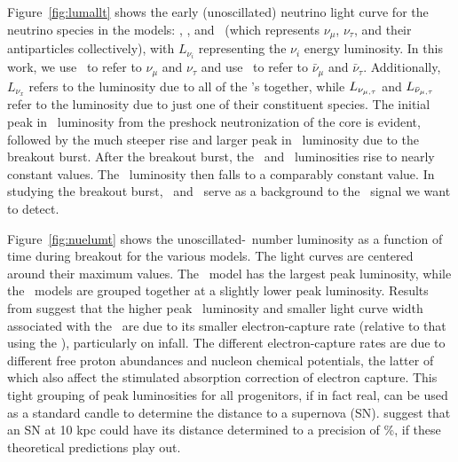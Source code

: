 Figure~\ref{fig:lumallt} shows the early (unoscillated) neutrino light curve for the
neutrino species in the models: \nue, \anue, and \nux\ (which represents
$\nu_\mu$, $\nu_\tau$, and their antiparticles collectively), with
$L_{\nu_i}$ representing the $\nu_i$ energy luminosity. In this work,
we use \nuxpart\ to refer to $\nu_\mu$ and $\nu_\tau$ and use \nuxanti\
to refer to $\bar\nu_\mu$ and $\bar\nu_\tau$.
Additionally, $L_{\nu_x}$ refers to the luminosity due to all of
the \nux's together, while  $L_{\nu_{\mu,\nobreak \tau}}$ and
$L_{\bar\nu_{\mu,\nobreak \tau}}$ refer to the luminosity due to just
one of their constituent species.
The initial peak in \nue\ luminosity
from the preshock neutronization of the core is evident, followed
by the much steeper rise and
larger peak in \nue\ luminosity due to the breakout burst. After the 
breakout burst, the \anue\ and
\nux\ luminosities rise to nearly constant values.  The \nue\ luminosity
then falls to a comparably constant value.  In studying the
breakout burst, \anue\ and \nux\ serve as a background 
to the \nue\ signal we want to detect.

Figure~\ref{fig:nuelumt} shows the unoscillated-\nue\ number luminosity as a function of
time during breakout for the various models. The light curves are
centered around their maximum values. The \shen\ model has the largest
peak luminosity,
while the \ls\ models are grouped together at a slightly lower peak
luminosity. 
Results from \cite{sullivanetal2015} suggest that the higher peak 
\nue\ luminosity and smaller light curve width associated with the \shen\ 
are due to its smaller electron-capture rate (relative to that 
using the \ls), particularly on infall.  The different 
electron-capture rates are due to different free proton 
abundances and nucleon chemical potentials, the latter of which 
also affect the stimulated absorption correction of electron capture.
This tight grouping of peak luminosities for all progenitors, 
if in fact real,
can be used as a standard candle to determine the distance to a
supernova (SN).  \cite{kachelriessetal2005} suggest that an SN at 10 kpc
could have its distance determined to a precision of \abt 5\%, if these
theoretical predictions play out.

